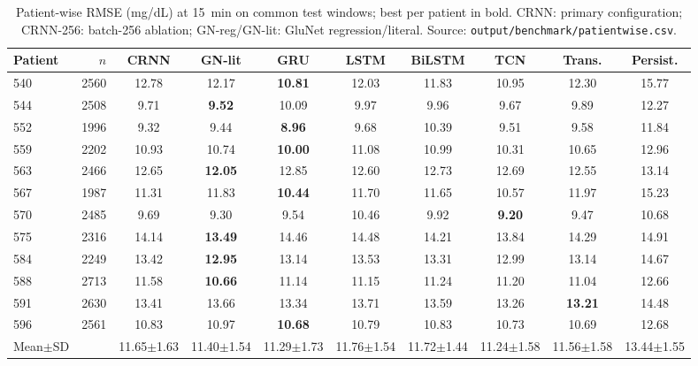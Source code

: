 \begin{table}[t]\centering
\caption{Patient-wise RMSE (mg/dL) at 15~min on common test windows; best per patient in bold. CRNN: primary configuration; CRNN-256: batch-256 ablation; GN-reg/GN-lit: GluNet regression/literal. Source: \texttt{output/benchmark/patientwise.csv}.}
\scriptsize\setlength{\tabcolsep}{3pt}
\begin{tabular}{lrcccccccc}\toprule
Patient & $n$ & CRNN & GN-lit & GRU & LSTM & BiLSTM & TCN & Trans. & Persist.\\\midrule
540 & 2560 & 12.78 & 12.17 & \textbf{10.81} & 12.03 & 11.83 & 10.95 & 12.30 & 15.77\\
544 & 2508 & 9.71 & \textbf{9.52} & 10.09 & 9.97 & 9.96 & 9.67 & 9.89 & 12.27\\
552 & 1996 & 9.32 & 9.44 & \textbf{8.96} & 9.68 & 10.39 & 9.51 & 9.58 & 11.84\\
559 & 2202 & 10.93 & 10.74 & \textbf{10.00} & 11.08 & 10.99 & 10.31 & 10.65 & 12.96\\
563 & 2466 & 12.65 & \textbf{12.05} & 12.85 & 12.60 & 12.73 & 12.69 & 12.55 & 13.14\\
567 & 1987 & 11.31 & 11.83 & \textbf{10.44} & 11.70 & 11.65 & 10.57 & 11.97 & 15.23\\
570 & 2485 & 9.69 & 9.30 & 9.54 & 10.46 & 9.92 & \textbf{9.20} & 9.47 & 10.68\\
575 & 2316 & 14.14 & \textbf{13.49} & 14.46 & 14.48 & 14.21 & 13.84 & 14.29 & 14.91\\
584 & 2249 & 13.42 & \textbf{12.95} & 13.14 & 13.53 & 13.31 & 12.99 & 13.14 & 14.67\\
588 & 2713 & 11.58 & \textbf{10.66} & 11.14 & 11.15 & 11.24 & 11.20 & 11.04 & 12.66\\
591 & 2630 & 13.41 & 13.66 & 13.34 & 13.71 & 13.59 & 13.26 & \textbf{13.21} & 14.48\\
596 & 2561 & 10.83 & 10.97 & \textbf{10.68} & 10.79 & 10.83 & 10.73 & 10.69 & 12.68\\
\midrule
Mean$\pm$SD & & 11.65$\pm$1.63 & 11.40$\pm$1.54 & 11.29$\pm$1.73 & 11.76$\pm$1.54 & 11.72$\pm$1.44 & 11.24$\pm$1.58 & 11.56$\pm$1.58 & 13.44$\pm$1.55\\
\bottomrule
\end{tabular}\end{table}
